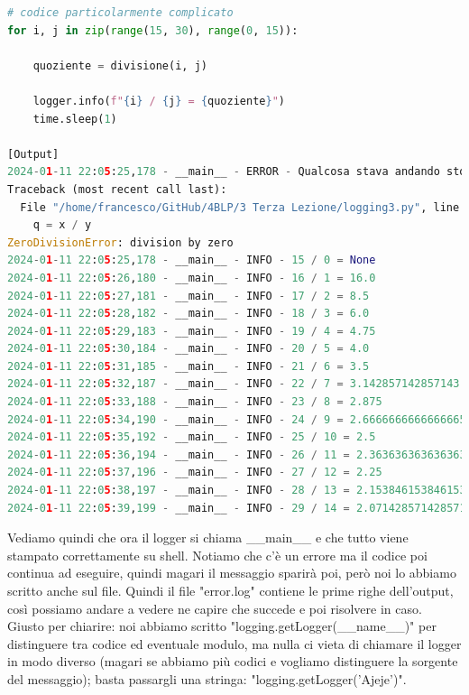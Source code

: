 \documentclass[10pt,a4paper]{article}
\begin{document}
\begin{lstlisting}[language=Python]
# codice particolarmente complicato
for i, j in zip(range(15, 30), range(0, 15)):

    quoziente = divisione(i, j)

    logger.info(f"{i} / {j} = {quoziente}")
    time.sleep(1)

[Output]
2024-01-11 22:05:25,178 - __main__ - ERROR - Qualcosa stava andando storto si stava per verificare il second impact
Traceback (most recent call last):
  File "/home/francesco/GitHub/4BLP/3 Terza Lezione/logging3.py", line 32, in divisione
    q = x / y
ZeroDivisionError: division by zero
2024-01-11 22:05:25,178 - __main__ - INFO - 15 / 0 = None
2024-01-11 22:05:26,180 - __main__ - INFO - 16 / 1 = 16.0
2024-01-11 22:05:27,181 - __main__ - INFO - 17 / 2 = 8.5
2024-01-11 22:05:28,182 - __main__ - INFO - 18 / 3 = 6.0
2024-01-11 22:05:29,183 - __main__ - INFO - 19 / 4 = 4.75
2024-01-11 22:05:30,184 - __main__ - INFO - 20 / 5 = 4.0
2024-01-11 22:05:31,185 - __main__ - INFO - 21 / 6 = 3.5
2024-01-11 22:05:32,187 - __main__ - INFO - 22 / 7 = 3.142857142857143
2024-01-11 22:05:33,188 - __main__ - INFO - 23 / 8 = 2.875
2024-01-11 22:05:34,190 - __main__ - INFO - 24 / 9 = 2.6666666666666665
2024-01-11 22:05:35,192 - __main__ - INFO - 25 / 10 = 2.5
2024-01-11 22:05:36,194 - __main__ - INFO - 26 / 11 = 2.3636363636363638
2024-01-11 22:05:37,196 - __main__ - INFO - 27 / 12 = 2.25
2024-01-11 22:05:38,197 - __main__ - INFO - 28 / 13 = 2.1538461538461537
2024-01-11 22:05:39,199 - __main__ - INFO - 29 / 14 = 2.0714285714285716
\end{lstlisting}
Vediamo quindi che ora il logger si chiama \_\_main\_\_ e che tutto viene stampato correttamente su shell. Notiamo che c'è un errore ma il codice poi continua ad eseguire, quindi magari il messaggio sparirà poi, però noi lo abbiamo scritto anche sul file. Quindi il file "error.log" contiene le prime righe dell'output, così possiamo andare a vedere ne capire che succede e poi risolvere in caso. Giusto per chiarire: noi abbiamo scritto "logging.getLogger(\_\_name\_\_)" per distinguere tra codice ed eventuale modulo, ma nulla ci vieta di chiamare il logger in modo diverso (magari se abbiamo più codici e vogliamo distinguere la sorgente del messaggio); basta passargli una stringa: "logging.getLogger('Ajeje')".
\end{document}
